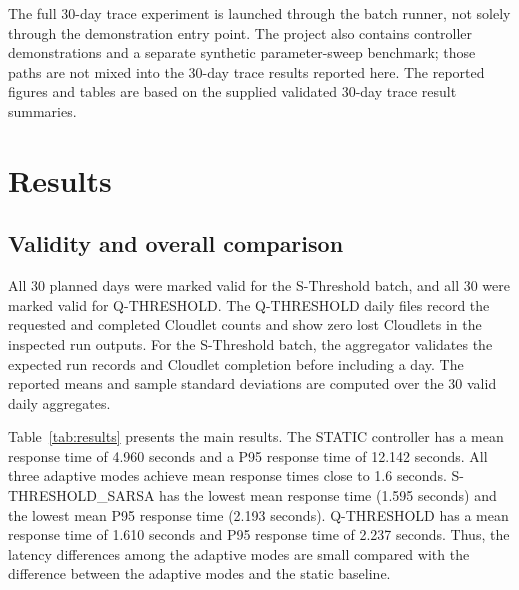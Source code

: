 \documentclass[pdflatex,sn-mathphys-num]{sn-jnl}
\begin{document}
The full 30-day trace experiment is launched through the batch runner, not solely through the demonstration entry point. The project also contains controller demonstrations and a separate synthetic parameter-sweep benchmark; those paths are not mixed into the 30-day trace results reported here. The reported figures and tables are based on the supplied validated 30-day trace result summaries.

\section{Results}\label{sec:results}

\subsection{Validity and overall comparison}

All 30 planned days were marked valid for the S-Threshold batch, and all 30 were marked valid for Q-THRESHOLD. The Q-THRESHOLD daily files record the requested and completed Cloudlet counts and show zero lost Cloudlets in the inspected run outputs. For the S-Threshold batch, the aggregator validates the expected run records and Cloudlet completion before including a day. The reported means and sample standard deviations are computed over the 30 valid daily aggregates.

Table~\ref{tab:results} presents the main results. The STATIC controller has a mean response time of 4.960 seconds and a P95 response time of 12.142 seconds. All three adaptive modes achieve mean response times close to 1.6 seconds. S-THRESHOLD\_SARSA has the lowest mean response time (1.595 seconds) and the lowest mean P95 response time (2.193 seconds). Q-THRESHOLD has a mean response time of 1.610 seconds and P95 response time of 2.237 seconds. Thus, the latency differences among the adaptive modes are small compared with the difference between the adaptive modes and the static baseline.
\end{document}
